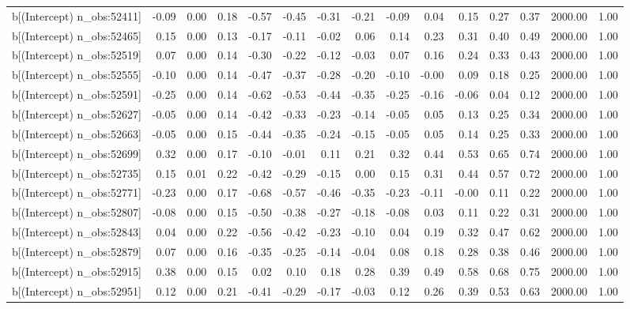 \begin{table}[ht]
\begin{tabular}{rrrrrrrrrrrrrrr}
  b[(Intercept) n\_obs:52411] & -0.09 & 0.00 & 0.18 & -0.57 & -0.45 & -0.31 & -0.21 & -0.09 & 0.04 & 0.15 & 0.27 & 0.37 & 2000.00 & 1.00 \\ 
  b[(Intercept) n\_obs:52465] & 0.15 & 0.00 & 0.13 & -0.17 & -0.11 & -0.02 & 0.06 & 0.14 & 0.23 & 0.31 & 0.40 & 0.49 & 2000.00 & 1.00 \\ 
  b[(Intercept) n\_obs:52519] & 0.07 & 0.00 & 0.14 & -0.30 & -0.22 & -0.12 & -0.03 & 0.07 & 0.16 & 0.24 & 0.33 & 0.43 & 2000.00 & 1.00 \\ 
  b[(Intercept) n\_obs:52555] & -0.10 & 0.00 & 0.14 & -0.47 & -0.37 & -0.28 & -0.20 & -0.10 & -0.00 & 0.09 & 0.18 & 0.25 & 2000.00 & 1.00 \\ 
  b[(Intercept) n\_obs:52591] & -0.25 & 0.00 & 0.14 & -0.62 & -0.53 & -0.44 & -0.35 & -0.25 & -0.16 & -0.06 & 0.04 & 0.12 & 2000.00 & 1.00 \\ 
  b[(Intercept) n\_obs:52627] & -0.05 & 0.00 & 0.14 & -0.42 & -0.33 & -0.23 & -0.14 & -0.05 & 0.05 & 0.13 & 0.25 & 0.34 & 2000.00 & 1.00 \\ 
  b[(Intercept) n\_obs:52663] & -0.05 & 0.00 & 0.15 & -0.44 & -0.35 & -0.24 & -0.15 & -0.05 & 0.05 & 0.14 & 0.25 & 0.33 & 2000.00 & 1.00 \\ 
  b[(Intercept) n\_obs:52699] & 0.32 & 0.00 & 0.17 & -0.10 & -0.01 & 0.11 & 0.21 & 0.32 & 0.44 & 0.53 & 0.65 & 0.74 & 2000.00 & 1.00 \\ 
  b[(Intercept) n\_obs:52735] & 0.15 & 0.01 & 0.22 & -0.42 & -0.29 & -0.15 & 0.00 & 0.15 & 0.31 & 0.44 & 0.57 & 0.72 & 2000.00 & 1.00 \\ 
  b[(Intercept) n\_obs:52771] & -0.23 & 0.00 & 0.17 & -0.68 & -0.57 & -0.46 & -0.35 & -0.23 & -0.11 & -0.00 & 0.11 & 0.22 & 2000.00 & 1.00 \\ 
  b[(Intercept) n\_obs:52807] & -0.08 & 0.00 & 0.15 & -0.50 & -0.38 & -0.27 & -0.18 & -0.08 & 0.03 & 0.11 & 0.22 & 0.31 & 2000.00 & 1.00 \\ 
  b[(Intercept) n\_obs:52843] & 0.04 & 0.00 & 0.22 & -0.56 & -0.42 & -0.23 & -0.10 & 0.04 & 0.19 & 0.32 & 0.47 & 0.62 & 2000.00 & 1.00 \\ 
  b[(Intercept) n\_obs:52879] & 0.07 & 0.00 & 0.16 & -0.35 & -0.25 & -0.14 & -0.04 & 0.08 & 0.18 & 0.28 & 0.38 & 0.46 & 2000.00 & 1.00 \\ 
  b[(Intercept) n\_obs:52915] & 0.38 & 0.00 & 0.15 & 0.02 & 0.10 & 0.18 & 0.28 & 0.39 & 0.49 & 0.58 & 0.68 & 0.75 & 2000.00 & 1.00 \\ 
  b[(Intercept) n\_obs:52951] & 0.12 & 0.00 & 0.21 & -0.41 & -0.29 & -0.17 & -0.03 & 0.12 & 0.26 & 0.39 & 0.53 & 0.63 & 2000.00 & 1.00 \\ 

\end{tabular}
\end{table}
